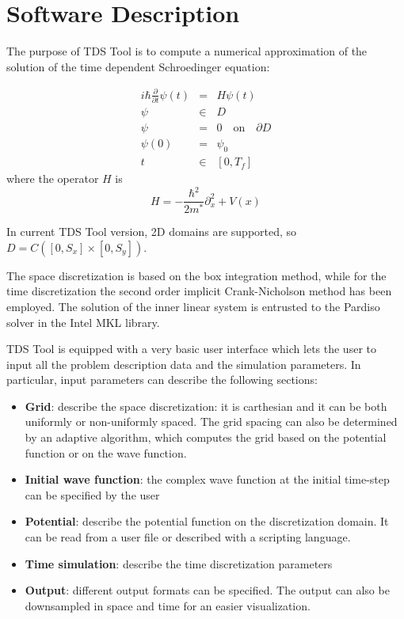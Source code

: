 \documentclass[a4paper,11pt]{article}
\begin{document}
\section{Software Description}
The purpose of TDS Tool is to compute a numerical approximation of the solution of the
time dependent Schroedinger equation:

\begin{eqnarray}
i \hbar \frac{\partial}{\partial t} \psi(t) & = & H \psi(t) \\
\psi & \in & D \\
\psi & = & 0 \quad \mbox{on} \quad \partial D \\
\psi(0) & = & \psi_0 \\
t & \in & [0, T_f]
\end{eqnarray}
where the operator $H$ is
$$ H = - \frac{\hbar ^2}{2m^*} \partial_x^2 + V(x) $$

In current TDS Tool version, 2D domains are supported, so
$ D = C([0, S_x] \times [0, S_y]) $.

The space discretization is based on the box integration method, while for the time discretization
the second order implicit Crank-Nicholson method has been employed. The solution of the inner
linear system is entrusted to the Pardiso solver in the Intel MKL library.

TDS Tool is equipped with a very basic user interface which lets the user to input
all the problem description data and the simulation parameters.
In particular, input parameters can describe the following sections:
\begin{itemize}
 \item \textbf{Grid}: describe the space discretization: it is carthesian and it can be both uniformly or non-uniformly spaced. The grid spacing can also be determined by an adaptive algorithm, which computes the grid based on the potential function or on the wave function.

 \item \textbf{Initial wave function}: the complex wave function at the initial time-step can be specified by the user

 \item \textbf{Potential}: describe the potential function on the discretization domain. It can be read from a user file or described with a scripting language.

 \item \textbf{Time simulation}: describe the time discretization parameters

 \item \textbf{Output}: different output formats can be specified. The output can also be downsampled in space and time for an easier visualization.

\end{itemize}
\end{document}
